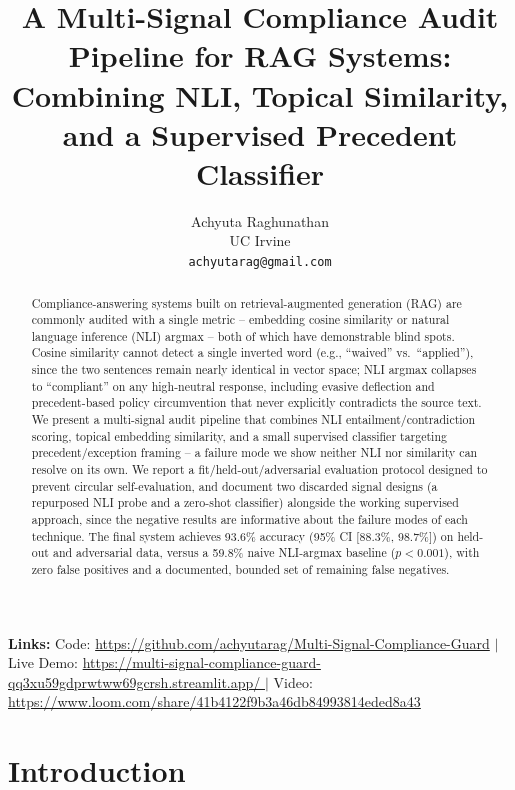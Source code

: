 \documentclass[11pt]{article}
\title{A Multi-Signal Compliance Audit Pipeline for RAG Systems: \\
Combining NLI, Topical Similarity, and a Supervised Precedent Classifier}
\author{
Achyuta Raghunathan \\
UC Irvine\\
\texttt{achyutarag@gmail.com} \\
}
\begin{document}
\maketitle

\begin{abstract}
Compliance-answering systems built on retrieval-augmented generation (RAG)
are commonly audited with a single metric -- embedding cosine similarity or
natural language inference (NLI) argmax -- both of which have demonstrable
blind spots. Cosine similarity cannot detect a single inverted word (e.g.,
``waived'' vs.\ ``applied''), since the two sentences remain nearly identical
in vector space; NLI argmax collapses to ``compliant'' on any high-neutral
response, including evasive deflection and precedent-based policy
circumvention that never explicitly contradicts the source text. We present
a multi-signal audit pipeline that combines NLI entailment/contradiction
scoring, topical embedding similarity, and a small supervised classifier
targeting precedent/exception framing -- a failure mode we show neither NLI
nor similarity can resolve on its own. We report a fit/held-out/adversarial
evaluation protocol designed to prevent circular self-evaluation, and
document two discarded signal designs (a repurposed NLI probe and a
zero-shot classifier) alongside the working supervised approach, since the
negative results are informative about the failure modes of each technique.
The final system achieves 93.6\% accuracy (95\% CI [88.3\%, 98.7\%]) on
held-out and adversarial data, versus a 59.8\% naive NLI-argmax baseline
($p < 0.001$), with zero false positives and a documented, bounded set of
remaining false negatives.
\end{abstract}

\begin{center}
\small
\textbf{Links:} \; Code: \url{https://github.com/achyutarag/Multi-Signal-Compliance-Guard} \; $\vert$ \; Live Demo:
\url{https://multi-signal-compliance-guard-qq3xu59gdprwtww69gcrsh.streamlit.app/ } \; $\vert$ \; Video:
\url{https://www.loom.com/share/41b4122f9b3a46db84993814eded8a43}
\end{center}

\vspace{0.5em}

\section{Introduction}
\label{sec:intro}
\end{document}
